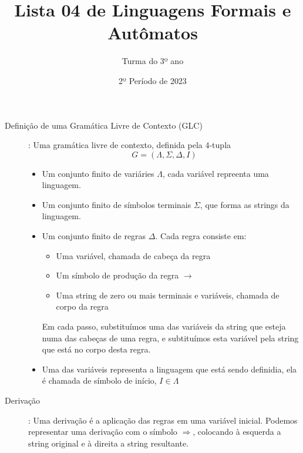 \documentclass[12pt]{article}
\title{Lista 04 de Linguagens Formais e Autômatos}
\date{2º Período de 2023}
\author{Turma do 3º ano}
\begin{document}
 

\maketitle

\begin{description}

\item[Definição de uma Gramática Livre de Contexto (GLC)]: Uma gramática livre de contexto, definida pela 4-tupla
\[G = (\Lambda, \Sigma, \Delta, I)\]
\begin{itemize}
\item Um conjunto finito de variáries $\Lambda$, cada variável repreenta uma linguagem.
\item Um conjunto finito de símbolos terminais $\Sigma$, que forma as strings da linguagem.
\item Um conjunto finito de regras $\Delta$. Cada regra consiste em:
  \begin{itemize}
  \item Uma variável, chamada de cabeça da regra
  \item Um símbolo de produção da regra $\rightarrow$
  \item Uma string de zero ou mais terminais e variáveis, chamada de corpo da regra
  \end{itemize}
  Em cada passo, substituímos uma das variáveis da string que esteja numa das cabeças de uma regra, e subtituímos esta variável pela string que está no corpo desta regra.
\item Uma das variáveis representa a linguagem que está sendo definidia, ela é chamada de símbolo de início, $I\in \Lambda$
\end{itemize}

\item[Derivação]: Uma derivação é a aplicação das regras em uma variável inicial. Podemos representar uma derivação com o símbolo $\Rightarrow$, colocando à esquerda a string original e à direita a string resultante.

\end{description}

\vspace{3em}
\end{document}
